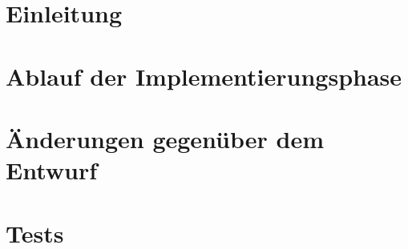 

	\maketitle
	\setcounter{tocdepth}{1}
	\tableofcontents

	\chapter{Einleitung}
		
	\chapter{Ablauf der Implementierungsphase}
		
	\chapter{Änderungen gegenüber dem Entwurf}
	\label{chap:aenderungf}
		
	\chapter{Tests}
	\label{chap:test}
		


